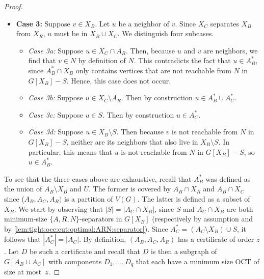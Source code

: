\begin{proof}
\begin{itemize}
		\item \textbf{Case 3:} Suppose $v \in X_B$. Let $u$ be a neighbor of $v$. Since $X_C$ separates $X_B$ from $X_R$, $u$ must be in $X_B \cup X_C$. We distinguish four subcases.
		\begin{itemize}
			\item \emph{Case 3a:} Suppose $u \in X_C \cap A_R$. Then, because $u$ and $v$ are neighbors, we find that $v \in N$ by definition of $N$. This contradicts the fact that $u \in A_B^\ast$, since $A_B^\ast \cap X_B$ only contains vertices that are not reachable from $N$ in $G[X_B] - S$. Hence, this case does not occur.
			\item \emph{Case 3b:} Suppose $u \in X_C \setminus A_R$. Then by construction $u \in A_B^\ast \cup A_C^\ast$.
			\item \emph{Case 3c:} Suppose $u \in S$. Then by construction $u \in A_C^\ast$.
			\item \emph{Case 3d:} Suppose $u \in X_B \setminus S$. Then because $v$ is not reachable from $N$ in $G[X_B] - S$, neither are its neighbors that also live in $X_B \setminus S$. In particular, this means that $u$ is not reachable from $N$ in $G[X_B] - S$, so $u \in A_B^\ast$.
		\end{itemize}
	\end{itemize}
	To see that the three cases above are exhaustive, recall that $A_B^\ast$ was defined as the union of $A_B \setminus X_B$ and $U$. The former is covered by $A_B \cap X_R$ and $A_B \cap X_C$ since ($A_B, A_C, A_R)$ is a partition of $V(G)$. The latter is defined as a subset of $X_B$.
	 We start by observing that $|S| = |A_C \cap X_B|$, since $S$ and $A_C \cap X_B$ are both minimum-size $\{A, R, N\}$-separators in $G[X_B]$ (respectively by assumption and by \cref{lem:tight:occ:cut:optimal:ARN:separator}). Since $A_C^\ast = (A_C \setminus X_B) \cup S$, it follows that $|A_C^\ast| = |A_C|$.
	 By definition, $(A_B, A_C, A_R)$ has a certificate of order $z$. Let $D$ be such a certificate and recall that $D$ is then a subgraph of $G[A_B \cup A_C]$ with components $D_1, \ldots, D_q$ that each have a minimum size OCT of size at most~$z$.
	

\end{proof}

